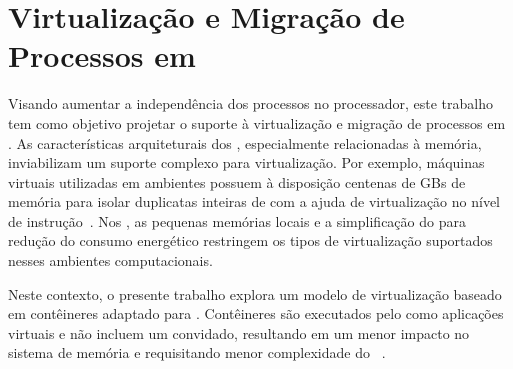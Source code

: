 \chapter{Virtualização e Migração de Processos em \Lws}
\label{chap.dev.virtualizacao}

Visando aumentar a independência dos processos no processador, este trabalho tem como objetivo projetar o suporte à virtualização e migração de processos em \lws. As características arquiteturais dos \lws, especialmente relacionadas à memória, inviabilizam um suporte complexo para virtualização. Por exemplo, máquinas virtuais utilizadas em ambientes \cloud possuem à disposição centenas de GBs de memória para isolar duplicatas inteiras de \oss com a ajuda de virtualização no nível de instrução~\cite{sharma2016containers}. Nos \lws, as pequenas memórias locais e a simplificação do \hardware para redução do consumo energético restringem os tipos de virtualização suportados nesses ambientes computacionais.

Neste contexto, o presente trabalho explora um modelo de virtualização baseado em contêineres adaptado para \lws. Contêineres são executados pelo \os como aplicações virtuais e não incluem um \os convidado, resultando em um menor impacto no sistema de memória e requisitando menor complexidade do \hardware~\cite{thalheim2018cntr, sharma2016containers}.


